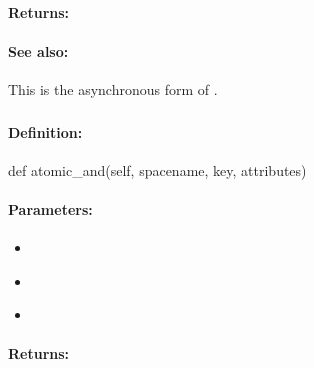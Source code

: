 \paragraph{Returns:}


\paragraph{See also:}  This is the asynchronous form of .

\pagebreak
\subsubsection{}
\label{api:python:atomic_and}


\paragraph{Definition:}
\begin{pythoncode}
def atomic_and(self, spacename, key, attributes)
\end{pythoncode}

\paragraph{Parameters:}
\begin{itemize}[noitemsep]
\item {}\\

\item {}\\

\item {}\\

\end{itemize}

\paragraph{Returns:}


\pagebreak
\subsubsection{}
\label{api:python:async_atomic_and}


